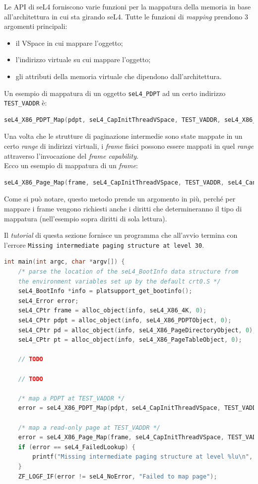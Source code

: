 Le API di seL4 forniscono varie funzioni per la mappatura della memoria in base all'architettura in cui sta girando seL4. Tutte le funzioni di \textit{mapping} prendono 3 argomenti principali:
\begin{itemize}
	\item il VSpace in cui mappare l'oggetto;
	\item l'indirizzo virtuale su cui mappare l'oggetto;
	\item gli attributi della memoria virtuale che dipendono dall'architettura.
\end{itemize}
Un esempio di mappatura di un oggetto \texttt{seL4\_PDPT} ad un certo indirizzo \texttt{TEST\_VADDR} è:
\begin{lstlisting}[language=C++]
seL4_X86_PDPT_Map(pdpt, seL4_CapInitThreadVSpace, TEST_VADDR, seL4_X86_Default_VMAttributes);
\end{lstlisting}

Una volta che le strutture di paginazione intermedie sono state mappate in un certo \textit{range} di indirizzi virtuali, i \textit{frame} fisici possono essere mappati in quel \textit{range} attraverso l'invocazione del \textit{frame capability}.\\
Ecco un esempio di mappatura di un \textit{frame}:
\begin{lstlisting}[language=C++]
seL4_X86_Page_Map(frame, seL4_CapInitThreadVSpace, TEST_VADDR, seL4_CanRead, seL4_X86_Default_VMAttributes);
\end{lstlisting}

Come si può notare, questo metodo prende un argomento in più, perché per mappare i frame vengono richiesti anche i diritti che determineranno il tipo di mappatura (nell'esempio sopra diritti di sola lettura).

Il \textit{tutorial} di questa sezione fornisce un programma che all'avvio termina con l'errore \texttt{Missing intermediate paging structure at level 30}.
\begin{lstlisting}[language=C++]
int main(int argc, char *argv[]) {
    /* parse the location of the seL4_BootInfo data structure from
    the environment variables set up by the default crt0.S */
    seL4_BootInfo *info = platsupport_get_bootinfo();
    seL4_Error error;
    seL4_CPtr frame = alloc_object(info, seL4_X86_4K, 0);
    seL4_CPtr pdpt = alloc_object(info, seL4_X86_PDPTObject, 0);
    seL4_CPtr pd = alloc_object(info, seL4_X86_PageDirectoryObject, 0);
    seL4_CPtr pt = alloc_object(info, seL4_X86_PageTableObject, 0);

	// TODO
	
	// TODO

    /* map a PDPT at TEST_VADDR */
    error = seL4_X86_PDPT_Map(pdpt, seL4_CapInitThreadVSpace, TEST_VADDR, seL4_X86_Default_VMAttributes);

    /* map a read-only page at TEST_VADDR */
    error = seL4_X86_Page_Map(frame, seL4_CapInitThreadVSpace, TEST_VADDR, seL4_CanRead, seL4_X86_Default_VMAttributes);
    if (error == seL4_FailedLookup) {
        printf("Missing intermediate paging structure at level %lu\n", seL4_MappingFailedLookupLevel());
    }
    ZF_LOGF_IF(error != seL4_NoError, "Failed to map page");
\end{lstlisting}

